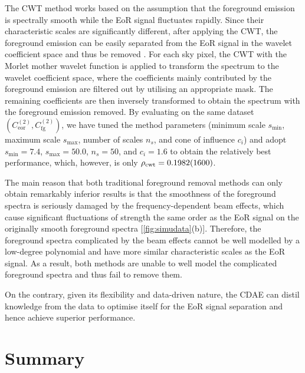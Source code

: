 \documentclass[fleqn,usenatbib]{mnras}
\newcommand{\R}[1]{\mathrm{#1}}
\newcommand{\editwip}[1]{{\leavevmode\color{magenta}#1}}
\begin{document}
\editwip{%
The CWT method works based on the assumption that the foreground emission
is spectrally smooth while the EoR signal fluctuates rapidly.
Since their characteristic scales are significantly different, after
applying the CWT, the foreground emission can be easily separated from
the EoR signal in the wavelet coefficient space and thus be removed
\citep{gu2013}.
For each sky pixel, the CWT with the Morlet mother wavelet function is
applied to transform the spectrum to the wavelet coefficient space, where
the coefficients mainly contributed by the foreground emission are filtered
out by utilising an appropriate mask.
The remaining coefficients are then inversely transformed to obtain the
spectrum with the foreground emission removed.
By evaluating on the same dataset
$\left( C_{\R{eor}}^{(2)}, C_{\R{fg}}^{(2)} \right)$,
we have tuned the method parameters (minimum scale $s_{\R{min}}$, maximum
scale $s_{\R{max}}$, number of scales $n_s$, and cone of influence $c_i$)
and adopt $s_{\R{min}} = 7.4$, $s_{\R{max}} = 50.0$, $n_s = 50$, and
$c_i = 1.6$ to obtain the relatively best performance, which, however, is
only $\rho_{\R{cwt}} = \num{0.1982+- 0.160}$.

The main reason that both traditional foreground removal methods can only
obtain remarkably inferior results is that the smoothness of the foreground
spectra is seriously damaged by the frequency-dependent beam effects, which
cause significant fluctuations of strength the same order as the EoR signal
on the originally smooth foreground spectra [\autoref{fig:simudata}(b)].
Therefore, the foreground spectra complicated by the beam effects cannot be
well modelled by a low-degree polynomial and have more similar
characteristic scales as the EoR signal.
As a result, both methods are unable to well model the complicated
foreground spectra and thus fail to remove them.} %
On the contrary, given its flexibility and data-driven nature,
the CDAE can distil knowledge from the data to optimise itself for
the EoR signal separation and hence achieve superior performance.


\section{Summary}
\label{sec:summary}
\end{document}
